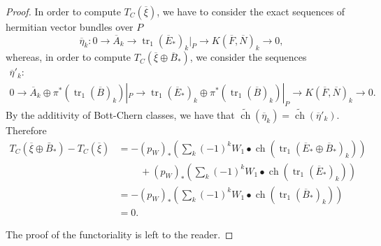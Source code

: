 \documentclass[10pt,twoside]{article}
\numberwithin{equation}{section}
\theoremstyle{plain}
\theoremstyle{definition}
\DeclareMathOperator{\tr}{tr}
\DeclareMathOperator{\ch}{ch}
\begin{document}
\begin{proof}
  In order to compute $T_{C}(\overline \xi)$, we have to
  consider the exact sequences of hermitian vector bundles over $P$ 
  \begin{displaymath}
    \overline {\eta}_{k}\colon 0\longrightarrow \overline A_{k}\longrightarrow
    \tr_{1}(\overline E_{\ast})_{k}|_{P}\longrightarrow  K(\overline
    F,\overline N)_{k}\longrightarrow 0,
  \end{displaymath}
  whereas, in order to compute  $T_{C}(\overline \xi\oplus \overline B_{\ast})$,
  we consider 
  the sequences
 \begin{multline*}
   \overline {\eta}'_{k}\colon \\
    0\longrightarrow \overline A_{k}\oplus \pi
    ^{\ast}(\tr_{1}(\overline B)_{k})|_{P}\longrightarrow 
    \tr_{1}(\overline E_{\ast})_{k}\oplus \pi
    ^{\ast}(\tr_{1}(\overline B)_{k})|_{P}\longrightarrow
    K(\overline F,\overline N)_{k}\longrightarrow 0. 
  \end{multline*}
  By the additivity of Bott-Chern classes, we have that $\widetilde
  {\ch}(\overline {\eta}_{k})=\widetilde
  {\ch}(\overline {\eta}'_{k})$. Therefore
  \begin{align*}
    T_{C}(\overline {\xi}\oplus \bar B_{\ast})-T_{C}(\overline {\xi})&=
    -(p_{W})_{\ast}
    \left(\sum_{k}(-1)^{k}W_{1} \bullet \ch(\tr_{1}(\overline E_{\ast}\oplus \overline B_{\ast})_{k})
    \right)\\ &\phantom{AAA}
    +(p_{W})_{\ast}
    \left(\sum_{k}(-1)^{k}W_{1} \bullet \ch(\tr_{1}(\overline E_{\ast})_{k})
    \right)\\
    &=-(p_{W})_{\ast}
    \left(\sum_{k}(-1)^{k}W_{1} \bullet \ch(\tr_{1}(\overline B_{\ast})_{k})
    \right)\\
    &=0.
  \end{align*}

  The proof of the functoriality is  left to the reader.
  

\end{proof}
\end{document}

